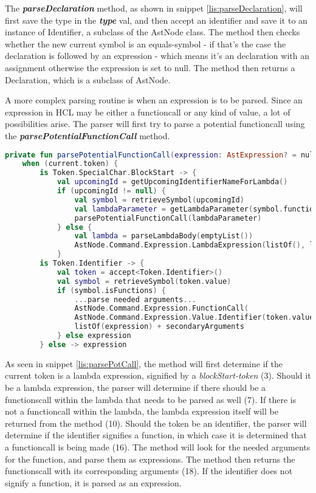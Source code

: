 The \textbf{\textit{parseDeclaration}} method, as shown in snippet \ref{lis:parseDeclaration}, will first save the type in the \textbf{\textit{type}} val, and then accept an identifier and save it to an instance of Identifier, a subclass of the AstNode class. 
The method then checks whether the new current symbol is an equals-symbol - if that's the case the declaration is followed by an expression - which means it's an declaration with an assignment otherwise the expression is set to null. 
The method then returns a Declaration, which is a subclass of AstNode.  

A more complex parsing routine is when an expression is to be parsed. 
Since an expression in HCL may be either a functioncall or any kind of value, a lot of possibilities arise. 
The parser will first try to parse a potential functioncall using the \textbf{\textit{parsePotentialFunctionCall}} method.

\begin{lstlisting}[language=Kotlin,label=lis:parsePotCall,caption=A simplified version of the parsePotentialFunctionCall method from the parser.]
private fun parsePotentialFunctionCall(expression: AstExpression? = null): AstExpression =
    when (current.token) {
        is Token.SpecialChar.BlockStart -> {
            val upcomingId = getUpcomingIdentifierNameForLambda()
            if (upcomingId != null) {
                val symbol = retrieveSymbol(upcomingId)
                val lambdaParameter = getLambdaParameter(symbol.functions, 0)
                parsePotentialFunctionCall(lambdaParameter)
            } else {
                val lambda = parseLambdaBody(emptyList())
                AstNode.Command.Expression.LambdaExpression(listOf(), lambda.type, lambda.lambdaBody)
            }
        is Token.Identifier -> {
            val token = accept<Token.Identifier>()
            val symbol = retrieveSymbol(token.value)
            if (symbol.isFunctions) {
        	    ...parse needed arguments...
        	    AstNode.Command.Expression.FunctionCall(
        	    AstNode.Command.Expression.Value.Identifier(token.value),
        	    listOf(expression) + secondaryArguments
            } else expression
        } else -> expression
\end{lstlisting}

As seen in snippet \ref{lis:parsePotCall}, the method will first determine if the current token is a lambda expression, signified by a \textit{blockStart-token} (3).
Should it be a lambda expression, the parser will determine if there should be a functionscall within the lambda that needs to be parsed as well (7).
If there is not a functioncall within the lambda, the lambda expression itself will be returned from the method (10). 
Should the token be an identifier, the parser will determine if the identifier signifies a function, in which case it is determined that a functioncall is being made (16).
The method will look for the needed arguments for the function, and parse them as expressions.
The method then returns the functionscall with its corresponding arguments (18).
If the identifier does not signify a function, it is parsed as an expression.

